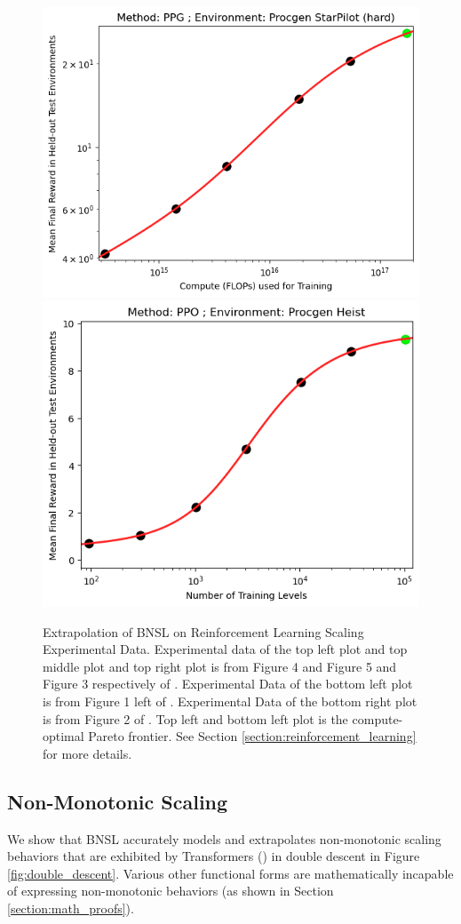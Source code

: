 \documentclass{article} %
\begin{document}
\begin{figure}[hhh]
\includegraphics[width=.341\textwidth]{figures/rl/procgen/Procgen_StarPilot_width_compute.png}
\includegraphics[width=.325\textwidth]{figures/rl/procgen/Procgen_Heist.png}
    \caption{
    Extrapolation of BNSL on Reinforcement Learning Scaling Experimental Data. Experimental data of the top left plot and top middle plot and top right plot is from Figure 4 and Figure 5 and Figure 3 respectively of \cite{neumann2022scaling}. Experimental Data of the bottom left plot is from Figure 1 left of \cite{hilton2023scaling}. Experimental Data of the bottom right plot is from Figure 2 of \cite{cobbe2020leveraging}. Top left and bottom left plot is the compute-optimal Pareto frontier. See Section \ref{section:reinforcement_learning} for more details.
    }
    \label{fig:rl_scaling}
\end{figure}
\FloatBarrier

\subsection{Non-Monotonic Scaling}
\label{section:non-monotonic_scaling}
We show that BNSL accurately models and extrapolates non-monotonic scaling behaviors that are exhibited by Transformers (\cite{vaswani2017attention}) in double descent \citep{nakkiran2021deep} in Figure \ref{fig:double_descent}. Various other functional forms are mathematically incapable of expressing non-monotonic behaviors (as shown in Section \ref{section:math_proofs}).

\vspace{-2.5mm}
\end{document}
